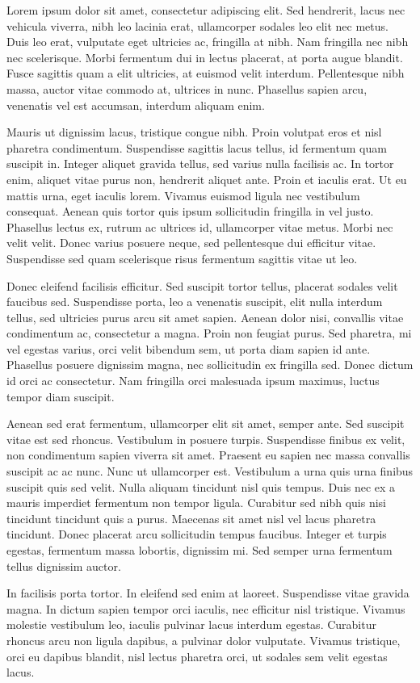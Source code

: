 Lorem ipsum dolor sit amet, consectetur adipiscing elit. Sed hendrerit, lacus nec vehicula viverra, nibh leo lacinia erat, ullamcorper sodales leo elit nec metus. Duis leo erat, vulputate eget ultricies ac, fringilla at nibh. Nam fringilla nec nibh nec scelerisque. Morbi fermentum dui in lectus placerat, at porta augue blandit. Fusce sagittis quam a elit ultricies, at euismod velit interdum. Pellentesque nibh massa, auctor vitae commodo at, ultrices in nunc. Phasellus sapien arcu, venenatis vel est accumsan, interdum aliquam enim.

Mauris ut dignissim lacus, tristique congue nibh. Proin volutpat eros et nisl pharetra condimentum. Suspendisse sagittis lacus tellus, id fermentum quam suscipit in. Integer aliquet gravida tellus, sed varius nulla facilisis ac. In tortor enim, aliquet vitae purus non, hendrerit aliquet ante. Proin et iaculis erat. Ut eu mattis urna, eget iaculis lorem. Vivamus euismod ligula nec vestibulum consequat. Aenean quis tortor quis ipsum sollicitudin fringilla in vel justo. Phasellus lectus ex, rutrum ac ultrices id, ullamcorper vitae metus. Morbi nec velit velit. Donec varius posuere neque, sed pellentesque dui efficitur vitae. Suspendisse sed quam scelerisque risus fermentum sagittis vitae ut leo.

Donec eleifend facilisis efficitur. Sed suscipit tortor tellus, placerat sodales velit faucibus sed. Suspendisse porta, leo a venenatis suscipit, elit nulla interdum tellus, sed ultricies purus arcu sit amet sapien. Aenean dolor nisi, convallis vitae condimentum ac, consectetur a magna. Proin non feugiat purus. Sed pharetra, mi vel egestas varius, orci velit bibendum sem, ut porta diam sapien id ante. Phasellus posuere dignissim magna, nec sollicitudin ex fringilla sed. Donec dictum id orci ac consectetur. Nam fringilla orci malesuada ipsum maximus, luctus tempor diam suscipit.

Aenean sed erat fermentum, ullamcorper elit sit amet, semper ante. Sed suscipit vitae est sed rhoncus. Vestibulum in posuere turpis. Suspendisse finibus ex velit, non condimentum sapien viverra sit amet. Praesent eu sapien nec massa convallis suscipit ac ac nunc. Nunc ut ullamcorper est. Vestibulum a urna quis urna finibus suscipit quis sed velit. Nulla aliquam tincidunt nisl quis tempus. Duis nec ex a mauris imperdiet fermentum non tempor ligula. Curabitur sed nibh quis nisi tincidunt tincidunt quis a purus. Maecenas sit amet nisl vel lacus pharetra tincidunt. Donec placerat arcu sollicitudin tempus faucibus. Integer et turpis egestas, fermentum massa lobortis, dignissim mi. Sed semper urna fermentum tellus dignissim auctor.

In facilisis porta tortor. In eleifend sed enim at laoreet. Suspendisse vitae gravida magna. In dictum sapien tempor orci iaculis, nec efficitur nisl tristique. Vivamus molestie vestibulum leo, iaculis pulvinar lacus interdum egestas. Curabitur rhoncus arcu non ligula dapibus, a pulvinar dolor vulputate. Vivamus tristique, orci eu dapibus blandit, nisl lectus pharetra orci, ut sodales sem velit egestas lacus. 

\citep{SAMSO2020100582}